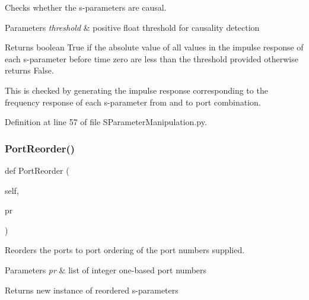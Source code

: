 Checks whether the s-\/parameters are causal. 


\begin{DoxyParams}{Parameters}
{\em threshold} & positive float threshold for causality detection \\
\hline
\end{DoxyParams}
\begin{DoxyReturn}{Returns}
boolean True if the absolute value of all values in the impulse response of each s-\/parameter before time zero are less than the threshold provided otherwise returns False.
\end{DoxyReturn}
This is checked by generating the impulse response corresponding to the frequency response of each s-\/parameter from and to port combination. 

Definition at line 57 of file S\+Parameter\+Manipulation.\+py.

\mbox{\label{classSignalIntegrity_1_1SParameters_1_1SParameterManipulation_1_1SParameterManipulation_a979f42e9c8bf72ce90999a24da8a839d}} 
\subsubsection{\texorpdfstring{Port\+Reorder()}{PortReorder()}}
{\footnotesize\ttfamily def Port\+Reorder (\begin{DoxyParamCaption}\item[{}]{self,  }\item[{}]{pr }\end{DoxyParamCaption})}



Reorders the ports to port ordering of the port numbers supplied. 


\begin{DoxyParams}{Parameters}
{\em pr} & list of integer one-\/based port numbers \\
\hline
\end{DoxyParams}
\begin{DoxyReturn}{Returns}
new instance of reordered s-\/parameters 
\end{DoxyReturn}



